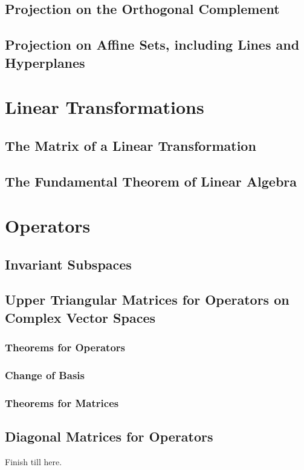 \documentclass[10pt]{article}
\begin{document}
\subsection{Projection on the Orthogonal Complement}
\subsection{Projection on Affine Sets, including Lines and Hyperplanes}

\section{Linear Transformations}
\subsection{The Matrix of a Linear Transformation}
\subsection{The Fundamental Theorem of Linear Algebra}

\section{Operators}
\subsection{Invariant Subspaces}
\subsection{Upper Triangular Matrices for Operators on Complex Vector Spaces}
\subsubsection{Theorems for Operators}
\subsubsection{Change of Basis}
\subsubsection{Theorems for Matrices}
\subsection{Diagonal Matrices for Operators}
\begin{mdframed}[backgroundcolor=red]
    Finish till here.
\end{mdframed}
\end{document}
